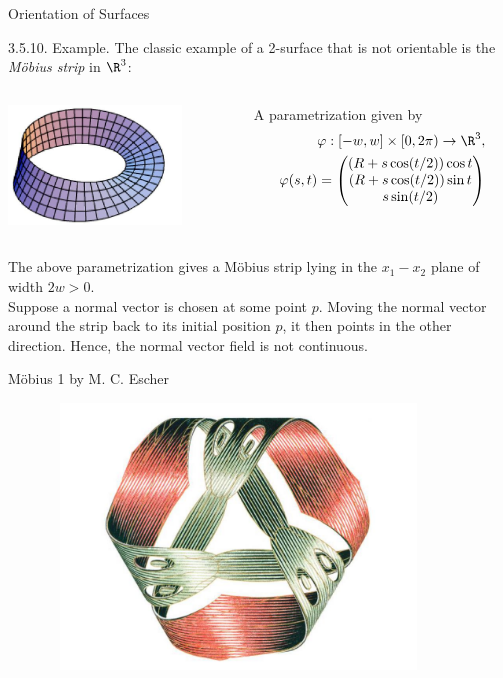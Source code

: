 \documentclass[smaller,hyperref={CJKbookmarks=true}]{beamer}
\begin{document}
\begin{frame}[t]{Orientation of Surfaces}
\begin{spacing}{1}
\alert{3.5.10. Example.} The classic example of a 2-surface that is not orientable is the \emph{M\"{o}bius strip} in $\R^3$:\\[7pt]
\begin{columns}[onlytextwidth]
\begin{column}{0.45\textwidth}
\includegraphics[width=\columnwidth,height=90pt]{95.jpg}
\end{column}
\begin{column}{0.55\textwidth}
A parametrization given by
\begin{align*}
&\varphi:[-w,w]\times[0,2\pi)\to\R^3, \\
\varphi(s,t) &=\begin{pmatrix}
                       (R+s\cos(t/2))\cos t \\
                       (R+s\cos(t/2))\sin t \\
                       s\sin(t/2)
               \end{pmatrix}
\end{align*}
\end{column}
\end{columns}
\vspace*{8pt}
The above parametrization gives a M\"{o}bius strip lying in the $x_1-x_2$ plane of width $2w>0$.\\[5pt]
Suppose a normal vector is chosen at some point $p$. Moving the normal
vector around the strip back to its initial position $p$, it then points in the
other direction. Hence, the normal vector field is not continuous.
\end{spacing}
\end{frame}
\begin{frame}[t]{M\"{o}bius 1 by M. C. Escher}
\begin{figure}
  \centering
  \includegraphics[width=0.9\textwidth,height=200pt]{73.jpg}

\end{figure}
\end{frame}
\end{document}
